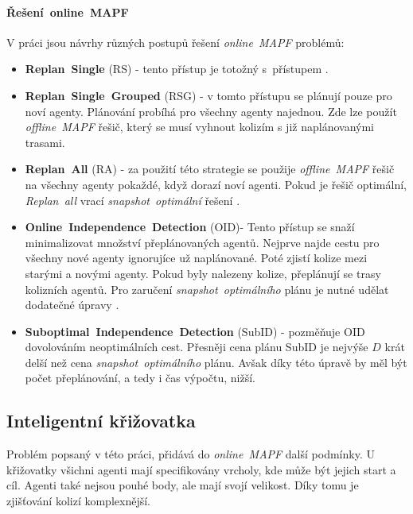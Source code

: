 \paragraph{Řešení~online~MAPF}

V práci \citet{Svancara} jsou návrhy různých postupů řešení \emph{online~MAPF} problémů:
\begin{itemize}
	\item \textbf{Replan~Single} (RS) - tento přístup je totožný s~přístupem .
	\item \textbf{Replan~Single~Grouped}\label{par:replan-single-grouped} (RSG) - v tomto přístupu se plánují pouze pro noví agenty.
	Plánování probíhá pro všechny agenty najednou.
	Zde lze použít \emph{offline~MAPF} řešič, který se musí vyhnout kolizím s již naplánovanými trasami.
	\item \textbf{Replan~All} (RA) - za použití této strategie se použije \emph{offline~MAPF} řešič na všechny agenty pokaždé, když dorazí noví agenti.
	Pokud je řešič optimální, \emph{Replan~all} vrací \emph{snapshot~optimální} řešení \citep{Svancara}.
	\item \textbf{Online~Independence~Detection} (OID)- Tento přístup se snaží minimalizovat množství přeplánovaných agentů.
	Nejprve najde cestu pro všechny nové agenty ignorujíce už naplánované.
	Poté zjistí kolize mezi starými a novými agenty.
	Pokud byly nalezeny kolize, přeplánují se trasy kolizních agentů.
	Pro zaručení \emph{snapshot~optimálního} plánu je nutné udělat dodatečné úpravy \citep{Svancara}.
	\item \textbf{Suboptimal~Independence~Detection} (SubID) - pozměňuje OID dovolováním neoptimálních cest.
	Přesněji cena plánu SubID je nejvýše $D$ krát delší než cena \emph{snapshot~optimálního} plánu.
	Avšak díky této úpravě by měl být počet přeplánování, a tedy i  čas výpočtu, nižší.
\end{itemize}

\subsection{Inteligentní křižovatka}\label{subsec:inteligentni-krizovatka}
Problém popsaný v této práci, přidává do \emph{online~MAPF} další podmínky.
U křižovatky všichni agenti mají specifikovány vrcholy, kde může být jejich start a cíl.
Agenti také nejsou pouhé body, ale mají svojí velikost.
Díky tomu je zjišťování kolizí komplexnější.

